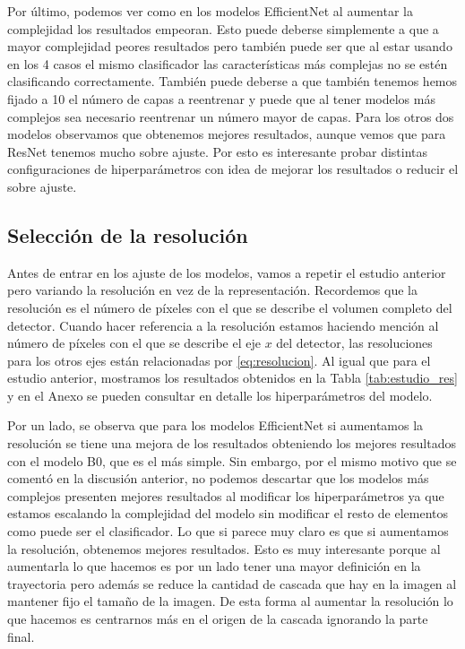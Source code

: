 \documentclass[a4paper,12pt,twoside,titlepage]{article}
\begin{document}
Por último, podemos ver como en los modelos EfficientNet al aumentar la complejidad los resultados empeoran. Esto puede deberse simplemente a que a mayor complejidad peores resultados pero también puede ser que al estar usando en los 4 casos el mismo clasificador las características más complejas no se estén clasificando correctamente. También puede deberse a que también tenemos hemos fijado a 10 el número de capas a reentrenar y puede que al tener modelos más complejos sea necesario reentrenar un número mayor de capas. Para los otros dos modelos observamos que obtenemos mejores resultados, aunque vemos que para ResNet tenemos mucho sobre ajuste. Por esto es interesante probar distintas configuraciones de hiperparámetros con idea de mejorar los resultados o reducir el sobre ajuste.  

\subsection{Selección de la resolución}

Antes de entrar en los ajuste de los modelos, vamos a repetir el estudio anterior pero variando la resolución en vez de la representación. Recordemos que la resolución es el número de píxeles con el que se describe el volumen completo del detector. Cuando hacer referencia a la resolución estamos haciendo mención al número de píxeles con el que se describe el eje $x$ del detector, las resoluciones para los otros ejes están relacionadas por \ref{eq:resolucion}. Al igual que para el estudio anterior, mostramos los resultados obtenidos en la Tabla \ref{tab:estudio_res} y en el Anexo se pueden consultar en detalle los hiperparámetros del modelo. 


Por un lado, se observa que para los modelos EfficientNet si aumentamos la resolución se tiene una mejora de los resultados obteniendo los mejores resultados con el modelo B0, que es el más simple. Sin embargo, por el mismo motivo que se comentó en la discusión anterior, no podemos descartar que los modelos más complejos presenten mejores resultados al modificar los hiperparámetros ya que estamos escalando la complejidad del modelo sin modificar el resto de elementos como puede ser el clasificador. Lo que si parece muy claro es que si aumentamos la resolución, obtenemos mejores resultados. Esto es muy interesante porque al aumentarla lo que hacemos es por un lado tener una mayor definición en la trayectoria pero además se reduce la cantidad de cascada que hay en la imagen al mantener fijo el tamaño de la imagen. De esta forma al aumentar la resolución lo que hacemos es centrarnos más en el origen de la cascada ignorando la parte final.
\end{document}
